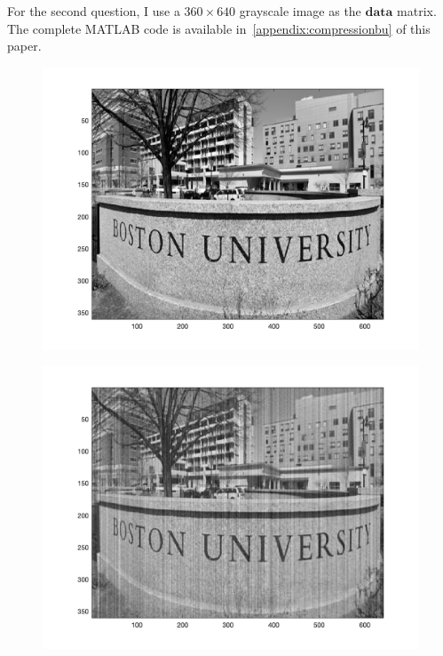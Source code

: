 \documentclass{article}
\begin{document}
For the second question, I use a \(360 \times 640\) grayscale image as the \(\mathbf{data}\) matrix. 
The complete MATLAB code is available in~\ref{appendix:compressionbu} of this paper. 
\begin{figure}[H]
    \centering
    \begin{minipage}{0.18\textwidth}
        \includegraphics[width=\linewidth]{pictures/compression0.png}
        \label{fig:image11}
    \end{minipage}
    \hfill
    \begin{minipage}{0.18\textwidth}
        \includegraphics[width=\linewidth]{pictures/compression1.png}
        \label{fig:image21}
    \end{minipage}

\end{figure}
\end{document}

